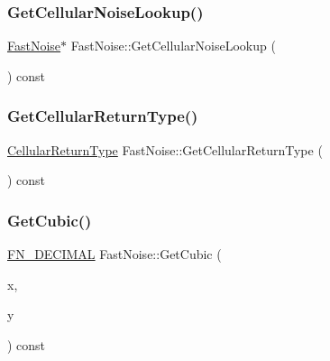 \mbox{\label{class_fast_noise_a4d6be0952a9b9a46d3772d8256e4ad37}} 
\subsubsection{\texorpdfstring{Get\+Cellular\+Noise\+Lookup()}{GetCellularNoiseLookup()}}
{\footnotesize\ttfamily \mbox{\hyperlink{class_fast_noise}{Fast\+Noise}}$\ast$ Fast\+Noise\+::\+Get\+Cellular\+Noise\+Lookup (\begin{DoxyParamCaption}{ }\end{DoxyParamCaption}) const\hspace{0.3cm}{\ttfamily [inline]}}

\mbox{\label{class_fast_noise_a6336a4871db63d0f30d01d784412574e}} 
\subsubsection{\texorpdfstring{Get\+Cellular\+Return\+Type()}{GetCellularReturnType()}}
{\footnotesize\ttfamily \mbox{\hyperlink{class_fast_noise_a942d73b97b870138c9a07249d5a57737}{Cellular\+Return\+Type}} Fast\+Noise\+::\+Get\+Cellular\+Return\+Type (\begin{DoxyParamCaption}{ }\end{DoxyParamCaption}) const\hspace{0.3cm}{\ttfamily [inline]}}

\mbox{\label{class_fast_noise_a6ac3a7389bfb70b0d34aa80cc7d7db0f}} 
\subsubsection{\texorpdfstring{Get\+Cubic()}{GetCubic()}\hspace{0.1cm}{\footnotesize\ttfamily [1/2]}}
{\footnotesize\ttfamily \mbox{\hyperlink{_fast_noise_8h_a75a9ef6d2541c4921815b885bfd449c3}{F\+N\+\_\+\+D\+E\+C\+I\+M\+AL}} Fast\+Noise\+::\+Get\+Cubic (\begin{DoxyParamCaption}\item[{\mbox{\hyperlink{_fast_noise_8h_a75a9ef6d2541c4921815b885bfd449c3}{F\+N\+\_\+\+D\+E\+C\+I\+M\+AL}}}]{x,  }\item[{\mbox{\hyperlink{_fast_noise_8h_a75a9ef6d2541c4921815b885bfd449c3}{F\+N\+\_\+\+D\+E\+C\+I\+M\+AL}}}]{y }\end{DoxyParamCaption}) const}

